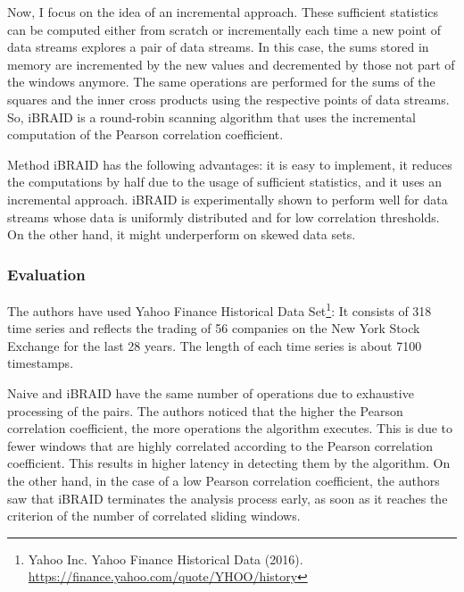 Now, I focus on the idea of an incremental approach. These sufficient statistics can be computed either from scratch or incrementally each time a new point of data streams explores a pair of data streams. In this case, the sums stored in memory are incremented by the new values and decremented by those not part of the windows anymore. The same operations are performed for the sums of the squares and the inner cross products using the respective points of data streams. So, iBRAID is a round-robin scanning algorithm that uses the incremental computation of the Pearson correlation coefficient. \newline

Method iBRAID has the following advantages: it is easy to implement, it reduces the computations by half due to the usage of sufficient statistics, and it uses an incremental approach. iBRAID is experimentally shown to perform well for data streams whose data is uniformly distributed and for low correlation thresholds. On the other hand, it might underperform on skewed data sets.

\subsubsection{Evaluation}
The authors have used Yahoo Finance Historical Data Set\footnote{Yahoo Inc. Yahoo Finance Historical Data (2016). \href{https://finance.yahoo.com/quote/YHOO/history}{https://finance.yahoo.com/quote/YHOO/history}}: It consists of 318 time series and reflects the trading of 56 companies on the New York Stock Exchange for the last 28 years. The length of each time series is about 7100 timestamps. \newline

Naive and iBRAID have the same number of operations due to exhaustive processing of the pairs. The authors noticed that the higher the Pearson correlation coefficient, the more operations the algorithm executes. This is due to fewer windows that are highly correlated according to the Pearson correlation coefficient. This results in higher latency in detecting them by the algorithm. On the other hand, in the case of a low Pearson correlation coefficient, the authors saw that iBRAID terminates the analysis process early, as soon as it reaches the criterion of the number of correlated sliding windows. 

